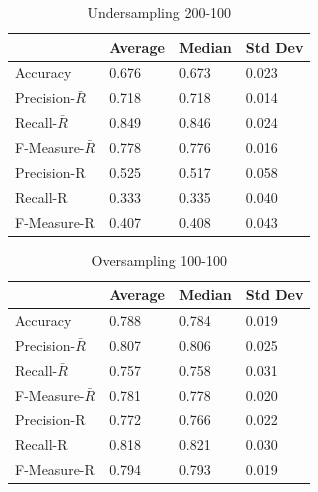 \documentclass[sigconf,review]{acmart}
\begin{document}
  \begin{table}[h]
  \caption{Undersampling 200-100} \label{table:Undersampling200}
    \begin{tabular}{llll}
    \hline
    \hline
    \multicolumn{1}{c}{}
    & \multicolumn{1}{c}{Average}
    & \multicolumn{1}{c}{Median}        
    &   \multicolumn{1}{c}{Std Dev}\\
    \hline
    Accuracy      & 0.676 &0.673 &0.023    \\
    \hline
    Precision-$\bar{R}$  &0.718 &0.718 &0.014     \\
    Recall-$\bar{R}$  &0.849 &0.846 &0.024\\
    F-Measure-$\bar{R}$    & 0.778 &0.776 &0.016\\
    \hline
    Precision-R          & 0.525  &0.517  &0.058\\
    Recall-R & 0.333 &0.335 &0.040\\
    F-Measure-R    &0.407 &0.408  &0.043\\
    \hline
    \hline
    \end{tabular}
  \end{table}


  \begin{table}[h]
  \caption{Oversampling 100-100} \label{table:Oversampling}
    \begin{tabular}{llll}
    \hline
    \hline
    \multicolumn{1}{c}{}
    & \multicolumn{1}{c}{Average}
    & \multicolumn{1}{c}{Median}        
    &   \multicolumn{1}{c}{Std Dev}\\
    \hline
    Accuracy      & 0.788 &0.784 &0.019    \\
    \hline
    Precision-$\bar{R}$  &0.807 &0.806 &0.025    \\
    Recall-$\bar{R}$  &0.757 &0.758 &0.031\\
    F-Measure-$\bar{R}$    & 0.781  &0.778  &0.020\\
    \hline
    Precision-R          & 0.772  &0.766  &0.022\\
    Recall-R & 0.818  &0.821  &0.030\\
    F-Measure-R    &0.794 &0.793  &0.019\\
    \hline
    \hline
    \end{tabular}

  \end{table}
\end{document}
